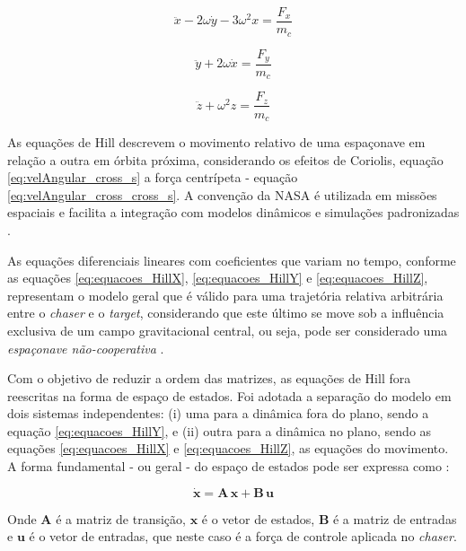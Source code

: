 \begin{equation}
    \label{eq:Hill_NASA_X}
    \ddot{x} - 2\omega \dot{y} - 3\omega^2 x = \frac{F_x}{m_c}
\end{equation}

\begin{equation}
    \label{eq:Hill_NASA_Y}
    \ddot{y} + 2\omega \dot{x} = \frac{F_y}{m_c}
\end{equation}

\begin{equation}
    \label{eq:Hill_NASA_Z}
    \ddot{z} + \omega^2 z = \frac{F_z}{m_c}
\end{equation}

As equações de Hill descrevem o movimento relativo de uma espaçonave em relação a outra em órbita próxima, considerando os efeitos de Coriolis, equação \eqref{eq:velAngular_cross_s} a força centrípeta - equação \eqref{eq:velAngular_cross_cross_s}. A convenção da NASA é utilizada em missões espaciais e facilita a integração com modelos dinâmicos e simulações padronizadas \cite{Folta2022}.


As equações diferenciais lineares com coeficientes que variam no tempo, conforme as equações \eqref{eq:equacoes_HillX}, \eqref{eq:equacoes_HillY} e \eqref{eq:equacoes_HillZ}, representam o modelo geral que é válido para uma trajetória relativa arbitrária \cite{debruijn2011,ortolano2017} entre o \emph{chaser} e o \emph{target}, considerando que este último se move sob a influência exclusiva de um campo gravitacional central, ou seja, pode ser considerado uma \emph{espaçonave não-cooperativa} \cite{mahendrakar2023}.

Com o objetivo de reduzir a ordem das matrizes, as equações de Hill fora reescritas na forma de espaço de estados. Foi adotada a separação do modelo em dois sistemas independentes: (i) uma para a dinâmica fora do plano, sendo a equação \eqref{eq:equacoes_HillY}, e (ii) outra para a dinâmica no plano, sendo as equações \eqref{eq:equacoes_HillX} e \eqref{eq:equacoes_HillZ}, as equações do movimento. A forma fundamental - ou geral - do espaço de estados pode ser expressa como \cite{fehse2003,starek2016,sherrill2014}:

\begin{equation}
    \dot{\mathbf{x}} = \mathbf{A}\,\mathbf{x} + \mathbf{B}\,\mathbf{u}
    \label{eq:state_space_general}
\end{equation}

Onde $\mathbf{A}$ é a matriz de transição, $\mathbf{x}$ é o vetor de estados, $\mathbf{B}$ é a matriz de entradas e $\mathbf{u}$ é o vetor de entradas, que neste caso é a força de controle aplicada no \emph{chaser}.

